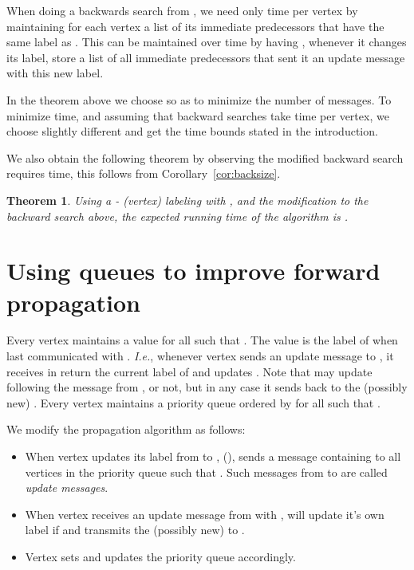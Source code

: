 \documentclass[11pt]{article}
\theoremstyle{plain}
\newtheorem{thm}{Theorem}[section]
\theoremstyle{definition}
\theoremstyle{remark}
\numberwithin{equation}{section}
\begin{document}
When doing a backwards search from , we need only  time per
vertex by  maintaining for each vertex  a list of its immediate
predecessors that have the same label as . This can be maintained
over time by having , whenever it changes its label, store a list
of all immediate predecessors that sent it an update message with
this new label.

In the theorem above we choose  so as to minimize the number of
messages. To minimize time, and assuming that backward searches take
 time per vertex, we choose slightly different  and get the
time bounds stated in the introduction.

We also obtain the following theorem by observing the modified
backward search requires  time, this follows from
 Corollary~\ref{cor:backsize}.

\begin{thm} \label{thm:33}
Using a - (vertex) labeling with , and
the modification to the backward search above, the expected running
time of the algorithm is .
\end{thm}




\section{Using queues to improve forward propagation} \label{nsquare:sec}


Every vertex  maintains  a value  for
all  such that . The value  is the label
of  when  last communicated with . {\sl I.e.}, whenever
vertex  sends an update message to , it receives in return the
current label of  and updates . Note that  may
update  following the message from , or not, but in any
case it sends back to  the (possibly new) . Every vertex
 maintains a priority queue ordered by  for all 
such that .

We modify the propagation algorithm as follows: \begin{itemize} \item When vertex  updates its label from  to ,  (),  sends a message containing  to all vertices  in the priority queue such that . Such messages from  to  are called {\sl update messages}.
\item When vertex  receives an update message from  with ,  will
 update it's own label  if  and transmits the (possibly new)  to .
 \item Vertex  sets  and updates the priority queue accordingly.
 \end{itemize}
\end{document}
